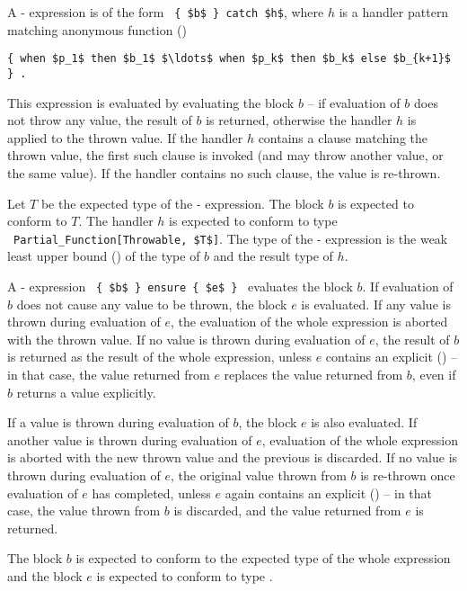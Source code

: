 A - expression is of the form ~\lstinline!{ $b$ } catch $h$!, where $h$ is a handler pattern matching anonymous function ()
\begin{lstlisting}
{ when $p_1$ then $b_1$ $\ldots$ when $p_k$ then $b_k$ else $b_{k+1}$ } .
\end{lstlisting}

This expression is evaluated by evaluating the block $b$ -- if evaluation of $b$ does not throw any value, the result of $b$ is returned, otherwise the handler $h$ is applied to the thrown value. If the handler $h$ contains a  clause matching the thrown value, the first such clause is invoked (and may throw another value, or the same value). If the handler contains no such clause, the value is re-thrown. 

Let $T$ be the expected type of the - expression. The block $b$ is expected to conform to $T$. The handler $h$ is expected to conform to type ~\lstinline!Partial_Function[Throwable, $T$]!. The type of the - expression is the weak least upper bound () of the type of $b$ and the result type of $h$. 

A - expression ~\lstinline!{ $b$ } ensure { $e$ }!~ evaluates the block $b$. If evaluation of $b$ does not cause any value to be thrown, the block $e$ is evaluated. If any value is thrown during evaluation of $e$, the evaluation of the whole expression is aborted with the thrown value. If no value is thrown during evaluation of $e$, the result of $b$ is returned as the result of the whole expression, unless $e$ contains an explicit  () -- in that case, the value returned from $e$ replaces the value returned from $b$, even if $b$ returns a value explicitly. 

If a value is thrown during evaluation of $b$, the  block $e$ is also evaluated. If another value is thrown during evaluation of $e$, evaluation of the whole expression is aborted with the new thrown value and the previous is discarded. If no value is thrown during evaluation of $e$, the original value thrown from $b$ is re-thrown once evaluation of $e$ has completed, unless $e$ again contains an explicit  () -- in that case, the value thrown from $b$ is discarded, and the value returned from $e$ is returned. 


The block $b$ is expected to conform to the expected type of the whole expression and the  block $e$ is expected to conform to type . 

